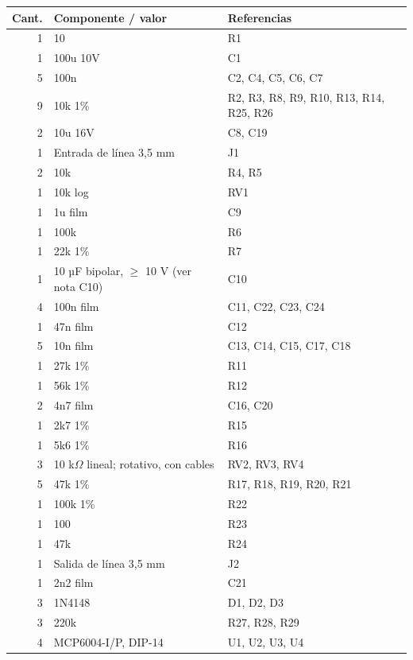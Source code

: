 \begin{longtable}{r p{65mm} p{72mm}}
\toprule Cant. & Componente / valor & Referencias\\\midrule\endhead
1 & 10 & R1\\
1 & 100u 10V & C1\\
5 & 100n & C2, C4, C5, C6, C7\\
9 & 10k 1\% & R2, R3, R8, R9, R10, R13, R14, R25, R26\\
2 & 10u 16V & C8, C19\\
1 & Entrada de línea 3,5 mm & J1\\
2 & 10k & R4, R5\\
1 & 10k log & RV1\\
1 & 1u film & C9\\
1 & 100k & R6\\
1 & 22k 1\% & R7\\
1 & 10 µF bipolar, \ensuremath{\geq} 10 V (ver nota C10) & C10\\
4 & 100n film & C11, C22, C23, C24\\
1 & 47n film & C12\\
5 & 10n film & C13, C14, C15, C17, C18\\
1 & 27k 1\% & R11\\
1 & 56k 1\% & R12\\
2 & 4n7 film & C16, C20\\
1 & 2k7 1\% & R15\\
1 & 5k6 1\% & R16\\
3 & 10 k\ensuremath{\Omega} lineal; rotativo, con cables & RV2, RV3, RV4\\
5 & 47k 1\% & R17, R18, R19, R20, R21\\
1 & 100k 1\% & R22\\
1 & 100 & R23\\
1 & 47k & R24\\
1 & Salida de línea 3,5 mm & J2\\
1 & 2n2 film & C21\\
3 & 1N4148 & D1, D2, D3\\
3 & 220k & R27, R28, R29\\
4 & MCP6004-I/P, DIP-14 & U1, U2, U3, U4\\
\bottomrule\end{longtable}
